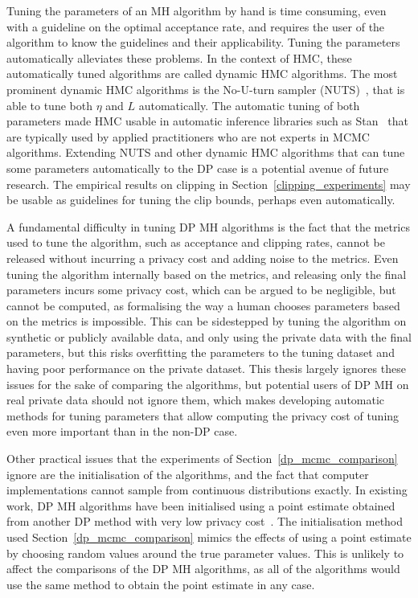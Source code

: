 \documentclass[english,twoside,openright]{HYgraduMLDS}
\begin{document}
Tuning the parameters of an MH algorithm by hand is time consuming,
even with a guideline on the optimal acceptance rate, and requires the user of
the algorithm to know the guidelines and their applicability. Tuning the
parameters automatically alleviates these problems. In the context of HMC, these
automatically tuned algorithms are called dynamic HMC algorithms. The most
prominent dynamic HMC algorithms is the No-U-turn sampler (NUTS)~\cite{HoG14},
that is able to tune both \(\eta\) and \(L\) automatically.
The automatic tuning of both parameters made HMC usable in automatic inference
libraries such as
Stan~\cite{stan} that are typically used by applied practitioners who are not
experts in MCMC algorithms. Extending NUTS and other dynamic HMC algorithms that
can tune some parameters automatically to the DP case is a potential avenue of
future research. The empirical results on clipping in
Section~\ref{clipping_experiments} may be usable as guidelines for tuning the
clip bounds, perhaps even automatically.

A fundamental difficulty in tuning DP MH algorithms is the fact that the
metrics used to tune the algorithm, such as acceptance and clipping rates,
cannot be released without incurring a privacy cost and adding noise to the
metrics. Even tuning the algorithm
internally based on the metrics, and releasing only the final parameters incurs
some privacy cost, which can be argued to be negligible, but cannot be
computed, as formalising the way a human chooses parameters based on the metrics
is impossible. This can be sidestepped by tuning the algorithm on synthetic or
publicly available data, and only using the private data with the final parameters,
but this risks overfitting the parameters to the tuning dataset and having
poor performance on the private dataset.
This thesis largely ignores these issues for the sake of comparing
the algorithms, but potential users of DP MH on real private data should not
ignore them, which makes developing automatic methods for tuning parameters
that allow computing the privacy cost of tuning
even more important than in the non-DP case.

Other practical issues that the experiments of Section~\ref{dp_mcmc_comparison}
ignore are the initialisation of the algorithms, and the fact that
computer implementations cannot sample from continuous distributions exactly.
In existing work, DP MH algorithms have been initialised using a point
estimate obtained from another DP method with very low privacy
cost~\cite{HeikkilaJDH19, WFS15}. The initialisation method used
Section~\ref{dp_mcmc_comparison} mimics the effects of using a point estimate by
choosing random values around the true parameter values. This is unlikely to
affect the comparisons of the DP MH algorithms, as all of the algorithms
would use the same method to obtain the point estimate in any case.
\end{document}
